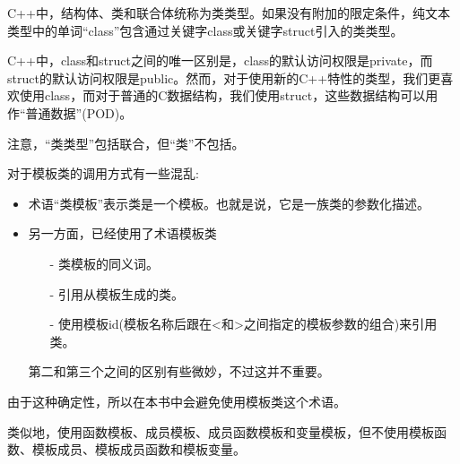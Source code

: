 C++中，结构体、类和联合体统称为类类型。如果没有附加的限定条件，纯文本类型中的单词“class”包含通过关键字class或关键字struct引入的类类型。

\begin{tcolorbox}[colback=webgreen!5!white,colframe=webgreen!75!black]
\hspace*{0.75cm}C++中，class和struct之间的唯一区别是，class的默认访问权限是private，而struct的默认访问权限是public。然而，对于使用新的C++特性的类型，我们更喜欢使用class，而对于普通的C数据结构，我们使用struct，这些数据结构可以用作“普通数据”(POD)。
\end{tcolorbox}

注意，“类类型”包括联合，但“类”不包括。

对于模板类的调用方式有一些混乱:

\begin{itemize}
\item 
术语“类模板”表示类是一个模板。也就是说，它是一族类的参数化描述。

\item 
另一方面，已经使用了术语模板类
\begin{itemize}
\item[-]
类模板的同义词。

\item[-]
引用从模板生成的类。

\item[-]
使用模板id(模板名称后跟在<和>之间指定的模板参数的组合)来引用类。
\end{itemize}

第二和第三个之间的区别有些微妙，不过这并不重要。
\end{itemize}

由于这种确定性，所以在本书中会避免使用模板类这个术语。

类似地，使用函数模板、成员模板、成员函数模板和变量模板，但不使用模板函数、模板成员、模板成员函数和模板变量。

















